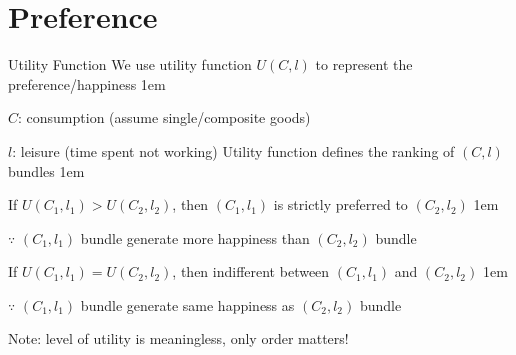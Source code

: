\documentclass[11pt,aspectratio=43]{beamer}
\let\olditemize=\itemize
\let\endolditemize=\enditemize
\renewenvironment{itemize}{\olditemize \itemsep1em}{\endolditemize}
\theoremstyle{definition}
\begin{document}
\section{Preference}
\label{sec:Preference}

\begin{frame}{Utility Function}
\label{slide:Utility_Function}
    We use utility function $ U( C, l ) $ to represent the \alert{preference/happiness}
    \begin{itemize}
        \item $ C $: consumption (assume single/composite goods)
        \item $ l $: leisure (time spent not working)
    \end{itemize}
    Utility function defines the \alert{ranking} of \alert{$(C, l)$ bundles}
    \begin{itemize}
        \item If $ U( C_{1}, l_{1} ) > U( C_{2}, l_{2} ) $, then $ ( C_{1}, l_{1} ) $ is \alert{strictly preferred} to $ ( C_{2}, l_{2} ) $
        \begin{itemize}
            \item $ \because $ $( C_{1}, l_{1} ) $ bundle generate \alert{more} happiness than $ ( C_{2}, l_{2} ) $ bundle
        \end{itemize}
        \item If $ U( C_{1}, l_{1} ) = U( C_{2}, l_{2} ) $, then \alert{indifferent} between $ ( C_{1}, l_{1} ) $ and $ ( C_{2}, l_{2} ) $
        \begin{itemize}
            \item $ \because $ $( C_{1}, l_{1} ) $ bundle generate \alert{same} happiness as $ ( C_{2}, l_{2} ) $ bundle
        \end{itemize}
        \item Note: \alert{level} of utility is meaningless, only \alert{order} matters!
    \end{itemize}
\end{frame}
\end{document}
